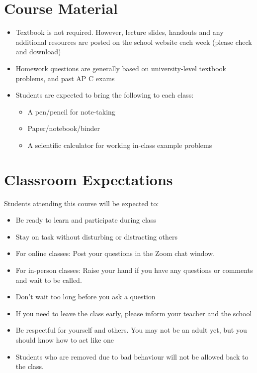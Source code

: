 \documentclass{../../oss-handout}
\begin{document}
\section*{Course Material}
\begin{itemize}[nosep]
\item Textbook is not required. However, lecture slides, handouts and any
  additional resources are posted on the school website each week (please check
  and download)
\item Homework questions are generally based on university-level textbook
  problems, and past AP C exams
\item Students are expected to bring the following to each class:
  \begin{itemize}[nosep]
  \item A pen/pencil for note-taking
  \item Paper/notebook/binder
  \item A scientific calculator for working in-class example problems
  \end{itemize}
\end{itemize}


\section*{Classroom Expectations}
Students attending this course will be expected to:
\begin{itemize}[nosep]
\item Be ready to learn and participate during class
\item Stay on task without disturbing or distracting others
\item For online classes: Post your questions in the Zoom chat window.
\item For in-person classes: Raise your hand if you have any questions or
  comments and wait to be called.
\item Don't wait too long before you ask a question
\item If you need to leave the class early, please inform your teacher and the
  school %
\item Be respectful for yourself and others. You may not be an adult yet, but
  you should know how to act like one%
\item Students who are removed due to bad behaviour will not be allowed back to
  the class.
\end{itemize}
\end{document}
